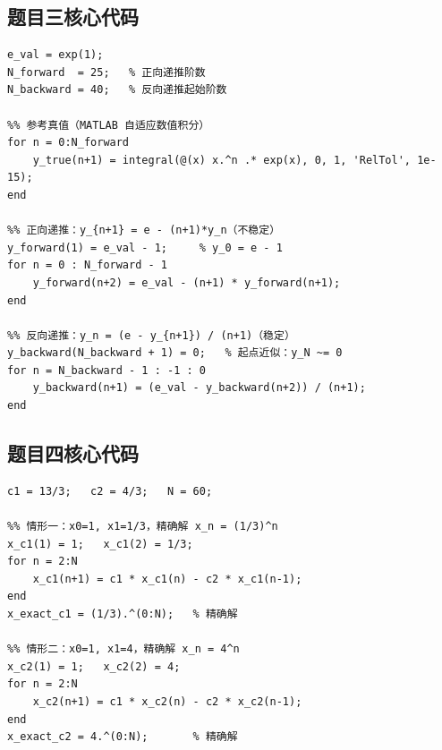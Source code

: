 \documentclass[UTF8,a4paper,11pt]{article}
\begin{document}
\subsection{题目三核心代码}

\begin{lstlisting}[style=matlab, caption={problem3\_integral\_recursion.m（核心部分）}]
e_val = exp(1);
N_forward  = 25;   % 正向递推阶数
N_backward = 40;   % 反向递推起始阶数

%% 参考真值（MATLAB 自适应数值积分）
for n = 0:N_forward
    y_true(n+1) = integral(@(x) x.^n .* exp(x), 0, 1, 'RelTol', 1e-15);
end

%% 正向递推：y_{n+1} = e - (n+1)*y_n（不稳定）
y_forward(1) = e_val - 1;     % y_0 = e - 1
for n = 0 : N_forward - 1
    y_forward(n+2) = e_val - (n+1) * y_forward(n+1);
end

%% 反向递推：y_n = (e - y_{n+1}) / (n+1)（稳定）
y_backward(N_backward + 1) = 0;   % 起点近似：y_N ~= 0
for n = N_backward - 1 : -1 : 0
    y_backward(n+1) = (e_val - y_backward(n+2)) / (n+1);
end
\end{lstlisting}

\subsection{题目四核心代码}

\begin{lstlisting}[style=matlab, caption={problem4\_sequence\_stability.m（核心部分）}]
c1 = 13/3;   c2 = 4/3;   N = 60;

%% 情形一：x0=1, x1=1/3，精确解 x_n = (1/3)^n
x_c1(1) = 1;   x_c1(2) = 1/3;
for n = 2:N
    x_c1(n+1) = c1 * x_c1(n) - c2 * x_c1(n-1);
end
x_exact_c1 = (1/3).^(0:N);   % 精确解

%% 情形二：x0=1, x1=4，精确解 x_n = 4^n
x_c2(1) = 1;   x_c2(2) = 4;
for n = 2:N
    x_c2(n+1) = c1 * x_c2(n) - c2 * x_c2(n-1);
end
x_exact_c2 = 4.^(0:N);       % 精确解
\end{lstlisting}
\end{document}
